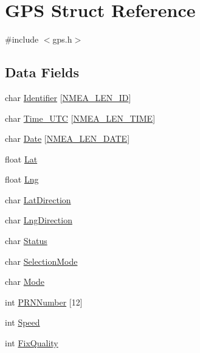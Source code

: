 \hypertarget{struct_g_p_s}{}\section{G\+PS Struct Reference}
\label{struct_g_p_s}


{\ttfamily \#include $<$gps.\+h$>$}

\subsection*{Data Fields}
\begin{DoxyCompactItemize}
\item 
char \hyperlink{struct_g_p_s_a2f25f39891792862837c122d70b6f1f0}{Identifier} \mbox{[}\hyperlink{_n_m_e_a_frame_8h_a2d2dcac4e93598e05e0b6e4247c3bab2}{N\+M\+E\+A\+\_\+\+L\+E\+N\+\_\+\+ID}\mbox{]}
\item 
char \hyperlink{struct_g_p_s_a04b4b60b521888a0a614d6ee09f5a845}{Time\+\_\+\+U\+TC} \mbox{[}\hyperlink{_n_m_e_a_frame_8h_a2484310edd727749c7c9b3501d978913}{N\+M\+E\+A\+\_\+\+L\+E\+N\+\_\+\+T\+I\+ME}\mbox{]}
\item 
char \hyperlink{struct_g_p_s_ad5af8c12c10ef1fa53275723fa3d7c7f}{Date} \mbox{[}\hyperlink{_n_m_e_a_frame_8h_a843f7aa20dc5f43cd8bdde1c9b60a7a1}{N\+M\+E\+A\+\_\+\+L\+E\+N\+\_\+\+D\+A\+TE}\mbox{]}
\item 
float \hyperlink{struct_g_p_s_a250e8b118a5e0c5df69686e73aadb93e}{Lat}
\item 
float \hyperlink{struct_g_p_s_a32b930867ce44de5756125a5b1eb3ac2}{Lng}
\item 
char \hyperlink{struct_g_p_s_aa92a668803187349c934de7155ca7899}{Lat\+Direction}
\item 
char \hyperlink{struct_g_p_s_a8b9b653f7f77114c11e76cca951b1972}{Lng\+Direction}
\item 
char \hyperlink{struct_g_p_s_a421a9b892a6c0a7018e5879488c78f35}{Status}
\item 
char \hyperlink{struct_g_p_s_af475b66847c31b452d77d11bec10cbd9}{Selection\+Mode}
\item 
char \hyperlink{struct_g_p_s_a019d407adf52806be23c21bf00a03232}{Mode}
\item 
int \hyperlink{struct_g_p_s_a789b07323eb6b2d06e9291e9ca308ca6}{P\+R\+N\+Number} \mbox{[}12\mbox{]}
\item 
int \hyperlink{struct_g_p_s_a04caa6dcdf90645ea95e5f3281d780cd}{Speed}
\item 
int \hyperlink{struct_g_p_s_a2ff40cecbeb0a88788ea90b5c400df60}{Fix\+Quality}

\end{DoxyCompactItemize}
